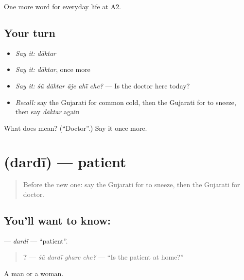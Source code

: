 \begin{grammarlens}[title={What you've built}]
One more word for everyday life at A2.
\end{grammarlens}

\subsection*{Your turn}
\begin{itemize}
\raggedright
  \item \emph{Say it:} \emph{dāktar}
  \item \emph{Say it:} \emph{dāktar}, once more
  \item \emph{Say it:} \emph{śũ dāktar āje ahī̃ che?} — Is the doctor here today?
  \item \emph{Recall:} say the Gujarati for common cold, then the Gujarati for to sneeze, then say \emph{dāktar} again
\end{itemize}

\begin{tcolorbox}[breakable,colback=teal!4,colframe=teal!35!black,title={Before you move on}]
What does  mean? (\textquotedblleft{}Doctor\textquotedblright{}.) Say it once more.
\end{tcolorbox}
\section[\texorpdfstring{\gu{દર્દી} (dardī)}{દર્દી (dardī)}]{ (dardī) — patient}

\label{lesson:GU-C224-dardi}



\begin{quote}
Before the new one: say the Gujarati for to sneeze, then the Gujarati for doctor.
\end{quote}

\subsection*{You'll want to know: }
\textbf{} — \emph{dardī} — \textquotedblleft{}patient\textquotedblright{}.

\begin{quote}
\textbf{   ?} — \emph{śũ dardī ghare che?} — \textquotedblleft{}Is the patient at home?\textquotedblright{}
\end{quote}

A man or a woman.

